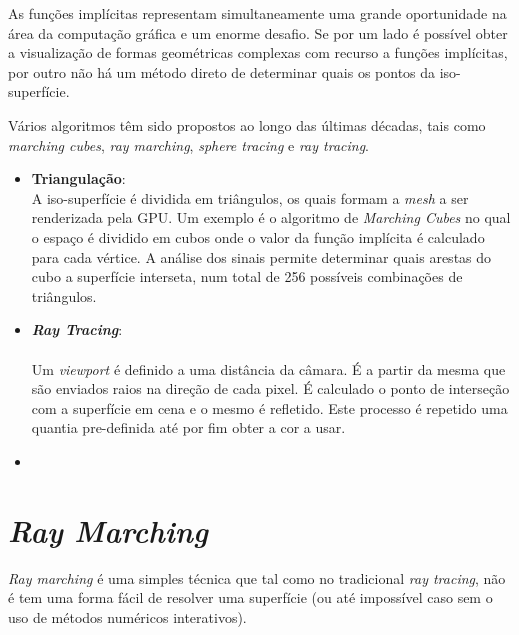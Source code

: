 As funções implícitas representam simultaneamente uma grande oportunidade na área da computação gráfica e um enorme desafio. Se por um lado é possível obter a visualização de formas geométricas complexas com recurso a funções implícitas, por outro não há um método direto de determinar quais os pontos da iso-superfície.

Vários algoritmos têm sido propostos ao longo das últimas décadas, tais como \textit{marching cubes}\cite{Lorensen1987}, \textit{ray marching}, \textit{sphere tracing}\cite{Hart1996} e \textit{ray tracing}.

\begin{itemize}
	
	\item \textbf{Triangulação}:\\
	A iso-superfície é dividida em triângulos, os quais formam a \textit{mesh} a ser renderizada pela \ac{GPU}. Um exemplo é o algoritmo de \textit{Marching Cubes}\cite{Lorensen1987} no qual o espaço é dividido em cubos onde o valor da função implícita é calculado para cada vértice. A análise dos sinais permite determinar quais arestas do cubo a superfície interseta, num total de 256 possíveis combinações de triângulos.
	
	\item \textbf{\textit{Ray Tracing}}:\\
    \revision{} \\
     Um \textit{viewport} é definido a uma distância da câmara. É a partir da mesma que são enviados raios na direção de cada pixel. É calculado o ponto de interseção com a superfície em cena e o mesmo é refletido. Este processo é repetido uma quantia pre-definida até por fim obter a cor a usar.
	
	\item {}
\end{itemize}


\section{\emph{Ray Marching}}
\label{sec::arte:raymarch}


\textit{Ray marching} é uma simples técnica que tal como no tradicional \textit{ray tracing}, não é tem uma forma fácil de resolver uma superfície (ou até impossível caso sem o uso de métodos numéricos interativos). 

